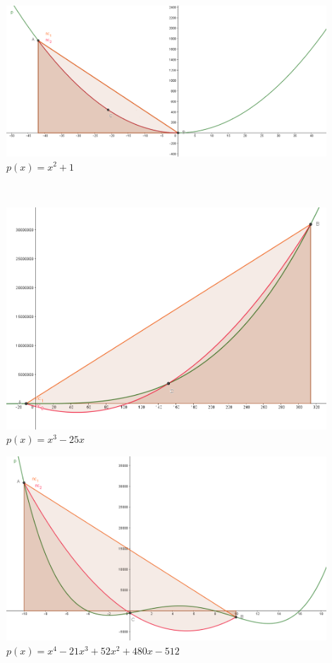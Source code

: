 \documentclass[course=erap]{aspdoc}
\begin{document}
\begin{minipage}[t]{0.5\textwidth}
\includegraphics[width=0.9\textwidth]{x^2+1_-42_0}\\
$p(x) = x^2+1$\\
\end{minipage}\\
\begin{minipage}[t]{0.5\textwidth}
\includegraphics[width=0.9\textwidth]{x^3-25x_-11_314}\\
$p(x) = x^3-25x$\\
\end{minipage}
\begin{minipage}[t]{0.5\textwidth}
\includegraphics[width=0.9\textwidth]{x^4-21x^3+52x^2+480x-512_-10_10}\\
$p(x) = x^4-21x^3+52x^2+480x-512$\\
\end{minipage}\\
\end{document}
